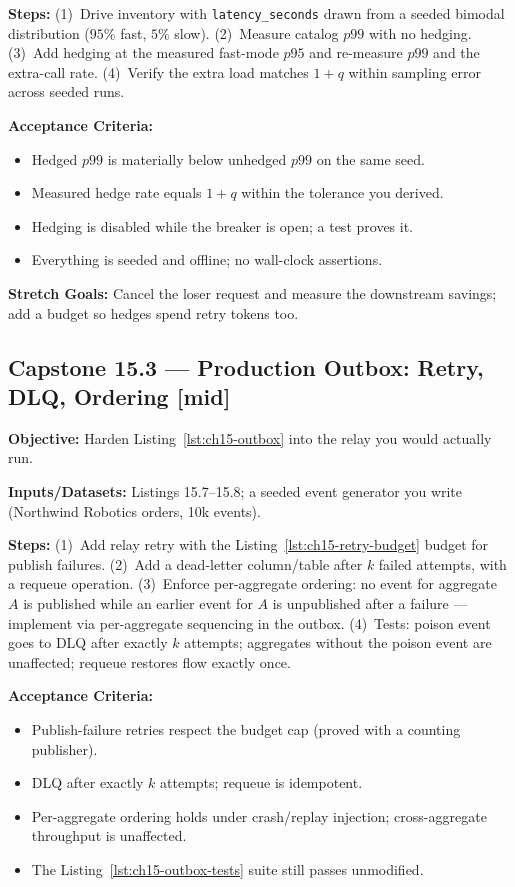 \textbf{Steps:} (1)~Drive inventory with \texttt{latency\_seconds} drawn
from a seeded bimodal distribution ($95\%$ fast, $5\%$ slow). (2)~Measure
catalog $p99$ with no hedging. (3)~Add hedging at the measured fast-mode
$p95$ and re-measure $p99$ and the extra-call rate. (4)~Verify the extra
load matches $1 + q$ within sampling error across seeded runs.

\textbf{Acceptance Criteria:}
\begin{itemize}
  \item[$\square$] Hedged $p99$ is materially below unhedged $p99$ on the
        same seed.
  \item[$\square$] Measured hedge rate equals $1 + q$ within the tolerance
        you derived.
  \item[$\square$] Hedging is disabled while the breaker is open; a test
        proves it.
  \item[$\square$] Everything is seeded and offline; no wall-clock
        assertions.
\end{itemize}

\textbf{Stretch Goals:} Cancel the loser request and measure the downstream
savings; add a budget so hedges spend retry tokens too.

\subsection*{Capstone 15.3 --- Production Outbox: Retry, DLQ, Ordering \hfill [mid]}
\textbf{Objective:} Harden Listing~\ref{lst:ch15-outbox} into the relay you
would actually run.

\textbf{Inputs/Datasets:} Listings 15.7--15.8; a seeded event generator you
write (Northwind Robotics orders, 10k events).

\textbf{Steps:} (1)~Add relay retry with the
Listing~\ref{lst:ch15-retry-budget} budget for publish failures.
(2)~Add a dead-letter column/table after $k$ failed attempts, with a
requeue operation. (3)~Enforce per-aggregate ordering: no event for
aggregate $A$ is published while an earlier event for $A$ is unpublished
after a failure --- implement via per-aggregate sequencing in the outbox.
(4)~Tests: poison event goes to DLQ after exactly $k$ attempts; aggregates
without the poison event are unaffected; requeue restores flow exactly
once.

\textbf{Acceptance Criteria:}
\begin{itemize}
  \item[$\square$] Publish-failure retries respect the budget cap (proved
        with a counting publisher).
  \item[$\square$] DLQ after exactly $k$ attempts; requeue is idempotent.
  \item[$\square$] Per-aggregate ordering holds under crash/replay
        injection; cross-aggregate throughput is unaffected.
  \item[$\square$] The Listing~\ref{lst:ch15-outbox-tests} suite still
        passes unmodified.
\end{itemize}

